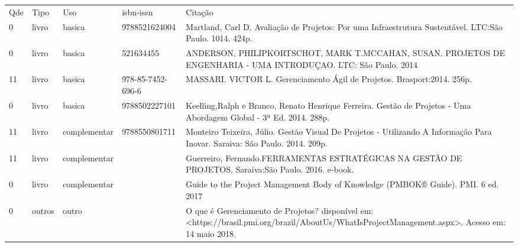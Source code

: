 \documentclass[12pt,a4paper,twoside]{report}
\begin{document}
\begin{tabular}{llllp{8cm}}
Qde & Tipo & Uso & isbn-issn & Citação \\
0&livro&basica&9788521624004&Martland, Carl D. Avaliação de Projetos: Por uma Infraestrutura Sustentável. LTC:São Paulo. 1014. 424p.\\
0&livro&basica&521634455&ANDERSON, PHILIPKORTSCHOT, MARK T.MCCAHAN, SUSAN. PROJETOS DE ENGENHARIA - UMA INTRODUÇAO. LTC: São Paulo. 2014\\
11&livro&basica&978-85-7452-696-6&MASSARI. VICTOR L. Gerenciamento Ágil de Projetos. Brasport:2014. 256p.\\
0&livro&basica&9788502227101&Keelling,Ralph e Branco, Renato Henrique Ferreira. Gestão de Projetos - Uma Abordagem Global - 3ª Ed. 2014. 288p.\\
11&livro&complementar&9788550801711&Monteiro Teixeira, Júlio. Gestão Visual De Projetos - Utilizando A Informação Para Inovar. Saraiva: São Paulo. 2014. 209p.\\
11&livro&complementar&&Guerreiro, Fernando.FERRAMENTAS ESTRATÉGICAS NA GESTÃO DE PROJETOS. Saraiva:São Paulo. 2016. e-book.\\
0&livro&complementar&&Guide to the Project Management Body of Knowledge (PMBOK® Guide). PMI. 6 ed. 2017\\
0&outros&outro&&O que é Gerenciamento de Projetos? disponível em:<https://brasil.pmi.org/brazil/AboutUs/WhatIsProjectManagement.aspx>. Acesso em: 14 maio 2018.\\
\end{tabular}
\end{document}
